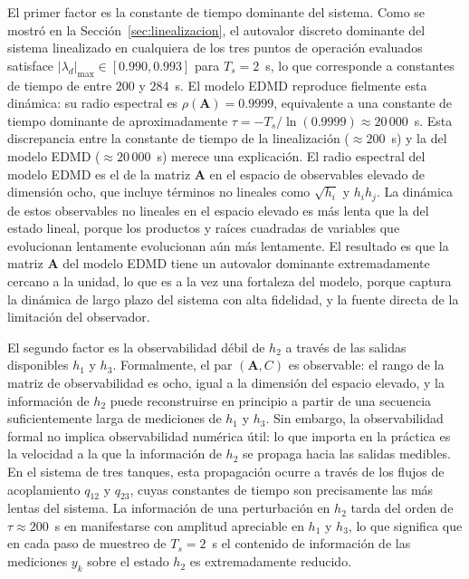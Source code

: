 \documentclass[12pt,letterpaper]{article}
\begin{document}
El primer factor es la constante de tiempo dominante del sistema. 
Como se mostró en la Sección~\ref{sec:linealizacion}, el 
autovalor discreto dominante del sistema linealizado en cualquiera 
de los tres puntos de operación evaluados satisface 
$|\lambda_d|_{\max} \in [0.990, 0.993]$ para $T_s = 2$~s, lo que 
corresponde a constantes de tiempo de entre $200$ y $284$~s. El 
modelo EDMD reproduce fielmente esta dinámica: su radio espectral 
es $\rho(\mathbf{A}) = 0.9999$, equivalente a una constante de 
tiempo dominante de aproximadamente $\tau = -T_s / \ln(0.9999) 
\approx 20\,000$~s. Esta discrepancia entre la constante de tiempo 
de la linealización ($\approx 200$~s) y la del modelo EDMD 
($\approx 20\,000$~s) merece una explicación. El radio espectral 
del modelo EDMD es el de la matriz $\mathbf{A}$ en el espacio de 
observables elevado de dimensión ocho, que incluye términos no 
lineales como $\sqrt{h_i}$ y $h_i h_j$. La dinámica de estos 
observables no lineales en el espacio elevado es más lenta que la 
del estado lineal, porque los productos y raíces cuadradas de 
variables que evolucionan lentamente evolucionan aún más 
lentamente. El resultado es que la matriz $\mathbf{A}$ del modelo 
EDMD tiene un autovalor dominante extremadamente cercano a la 
unidad, lo que es a la vez una fortaleza del modelo, porque
captura la dinámica de largo plazo del sistema con alta
fidelidad, y la fuente directa de la limitación del observador.

El segundo factor es la observabilidad débil de $h_2$ a través 
de las salidas disponibles $h_1$ y $h_3$. Formalmente, el par 
$(\mathbf{A}, C)$ es observable: el rango de la matriz de 
observabilidad es ocho, igual a la dimensión del espacio elevado, 
y la información de $h_2$ puede reconstruirse en principio a partir 
de una secuencia suficientemente larga de mediciones de $h_1$ y 
$h_3$. Sin embargo, la observabilidad formal no implica 
observabilidad numérica útil: lo que importa en la práctica es 
la velocidad a la que la información de $h_2$ se propaga hacia las 
salidas medibles. En el sistema de tres tanques, esta propagación 
ocurre a través de los flujos de acoplamiento $q_{12}$ y $q_{23}$, 
cuyas constantes de tiempo son precisamente las más lentas del 
sistema. La información de una perturbación en $h_2$ tarda del 
orden de $\tau \approx 200$~s en manifestarse con amplitud 
apreciable en $h_1$ y $h_3$, lo que significa que en cada paso 
de muestreo de $T_s = 2$~s el contenido de información de las 
mediciones $y_k$ sobre el estado $h_2$ es extremadamente reducido.
\end{document}
